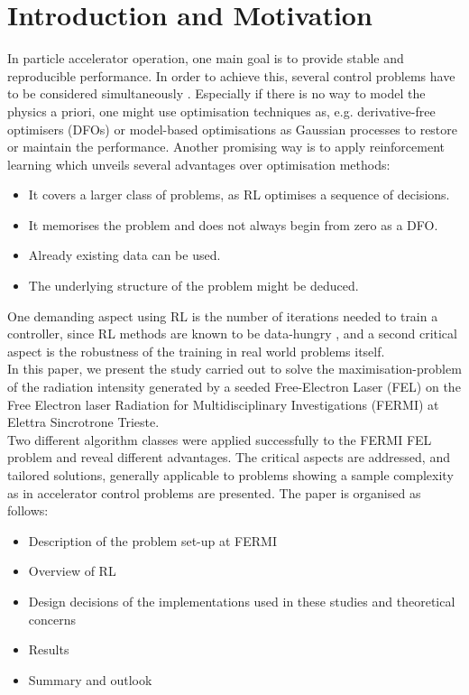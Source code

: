 \documentclass[
reprint,
amsmath,amssymb,amsfonts,clevref,
aps,
prstab,
]{revtex4-2}
\begin{document}
	\section{Introduction and Motivation}
	In particle accelerator operation, one main goal is to provide stable and reproducible performance. In order to achieve this, several control problems have to be considered simultaneously \cite{Kain2020}. Especially if there is no way to model the physics a priori, one might use optimisation techniques as, e.g. derivative-free optimisers (DFOs) \cite{Huang2013,Bruchon2017,Scheinker2020,Hirlaender2019,Welsch2015} or model-based optimisations as Gaussian processes \cite{Hanuka2020,Roussel2020} to restore or maintain the performance. Another promising way is to apply reinforcement learning \cite{Bruchon2020,Bruchon2019,Kain2020,Pang2020} which unveils several advantages over optimisation methods:
	\begin{itemize}
		\item It covers a larger class of problems, as RL optimises a sequence of decisions.
		\item It memorises the problem and does not always begin from zero as a DFO.
		\item Already existing data can be used.
		\item The underlying structure of the problem might be deduced.
	\end{itemize}
	One demanding aspect using RL is the number of iterations needed to train a controller, since RL methods are known to be data-hungry \cite{Sutton2018}, and a second critical aspect is the robustness of the training in real world problems itself.\\
	In this paper, we present the study carried out to solve the maximisation-problem of the radiation intensity generated by a seeded Free-Electron Laser (FEL) on the Free Electron laser Radiation for Multidisciplinary Investigations (FERMI) at Elettra Sincrotrone Trieste.\\
	 Two different algorithm classes were applied successfully to the FERMI FEL problem and reveal different advantages. The critical aspects are addressed, and tailored solutions, generally applicable to problems showing a sample complexity as in accelerator control problems are presented.
	The paper is organised as follows:
	\begin{itemize}
		\item Description of the problem set-up at FERMI
		\item Overview of RL
		\item Design decisions of the implementations used in these studies and theoretical concerns
		\item Results 
		\item Summary and outlook
	\end{itemize}
	
\end{document}
